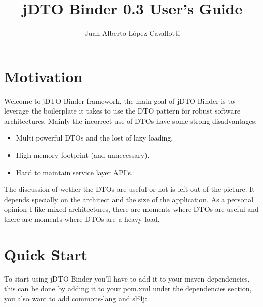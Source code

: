 \documentclass[11pt]{article}
\title{jDTO Binder 0.3 User's Guide}
\author{Juan Alberto López Cavallotti}
\newcommand{\JDTO}{jDTO Binder\xspace}
\begin{document}
\maketitle
\tableofcontents

\newpage
\section{Motivation}


Welcome to \JDTO framework, the main goal of \JDTO is to leverage the boilerplate it takes to use
the DTO pattern for robust software architectures. Mainly the incorrect use of DTOs have some strong
disadvantages: 

\begin{itemize}
\item Multi powerful DTOs and the lost of lazy loading.
\item High memory footprint (and unnecessary).
\item Hard to maintain service layer API's.
\end{itemize}

The discussion of wether the DTOs are useful or not is left out of the picture. It depends specially on 
the architect and the size of the application. As a personal opinion I like mixed architectures, there are
moments where DTOs are useful and there are moments where DTOs are a heavy load.

\section{Quick Start}


To start using \JDTO you'll have to add it to your maven dependencies, this can be done
by adding it to your pom.xml under the dependencies section, you also want to add commons-lang and slf4j:

\end{document}
